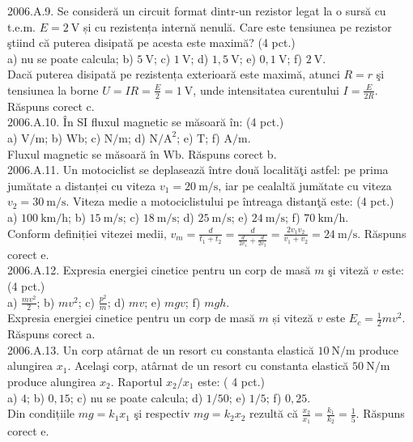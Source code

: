 2006.A.9. Se consideră un circuit format dintr-un rezistor legat la o sursă cu t.e.m. $E=2 \mathrm{~V}$ și cu rezistența internă nenulă. Care este tensiunea pe rezistor ştiind că puterea disipată pe acesta este maximă? (4 pct.)\\ a) nu se poate calcula; b) $5 \mathrm{~V}$; c) $1 \mathrm{~V}$; d) $1,5 \mathrm{~V}$; e) $0,1 \mathrm{~V}$; f) $2 \mathrm{~V}$.\\ Dacă puterea disipată pe rezistența exterioară este maximă, atunci $R=r$ şi tensiunea la borne $U=I R=\frac{E}{2}=1 \mathrm{~V}$, unde intensitatea curentului $I=\frac{E}{2 R}$. Răspuns corect c.\\

2006.A.10. În SI fluxul magnetic se măsoară în: (4 pct.)\\ a) $\mathrm{V} / \mathrm{m}$; b) $\mathrm{Wb}$; c) $\mathrm{N} / \mathrm{m}$; d) $\mathrm{N} / \mathrm{A}^{2}$; e) $\mathrm{T}$; f) $\mathrm{A} / \mathrm{m}$.\\ Fluxul magnetic se măsoară în $\mathrm{Wb}$. Răspuns corect b.\\

2006.A.11. Un motociclist se deplasează între două localităţi astfel: pe prima jumătate a distanței cu viteza $v_{1}=20 \mathrm{~m} / \mathrm{s}$, iar pe cealaltă jumătate cu viteza $v_{2}=30 \mathrm{~m} / \mathrm{s}$. Viteza medie a motociclistului pe întreaga distanţă este: (4 pct.)\\ a) $100 \mathrm{~km} / \mathrm{h}$; b) $15 \mathrm{~m} / \mathrm{s}$; c) $18 \mathrm{~m} / \mathrm{s}$; d) $25 \mathrm{~m} / \mathrm{s}$; e) $24 \mathrm{~m} / \mathrm{s}$; f) $70 \mathrm{~km} / \mathrm{h}$.\\ Conform definiției vitezei medii, $v_{m}=\frac{d}{t_{1}+t_{2}}=\frac{d}{\frac{d}{2 v_{1}}+\frac{d}{2 v_{2}}}=\frac{2 v_{1} v_{2}}{v_{1}+v_{2}}=24 \mathrm{~m} / \mathrm{s}$. Răspuns corect e.\\

2006.A.12. Expresia energiei cinetice pentru un corp de masă $m$ şi viteză $v$ este: (4 pct.)\\ a) $\frac{m v^{2}}{2}$; b) $m v^{2}$; c) $\frac{p^{2}}{m}$; d) $m v$; e) $m g v$; f) $m g h$.\\ Expresia energiei cinetice pentru un corp de masă $m$ și viteză $v$ este $E_{c}=\frac{1}{2} m v^{2}$. Răspuns corect a.\\

2006.A.13. Un corp atârnat de un resort cu constanta elastică $10 \mathrm{~N} / \mathrm{m}$ produce alungirea $x_{1}$. Acelaşi corp, atârnat de un resort cu constanta elastică $50 \mathrm{~N} / \mathrm{m}$ produce alungirea $x_{2}$. Raportul $x_{2} / x_{1}$ este: ( 4 pct.)\\ a) $4$; b) $0,15$; c) nu se poate calcula; d) $1 / 50$; e) $1 / 5$; f) $0,25$.\\ Din condițiile $m g=k_{1} x_{1}$ şi respectiv $m g=k_{2} x_{2}$ rezultă că $\frac{x_{2}}{x_{1}}=\frac{k_{1}}{k_{2}}=\frac{1}{5}$. Răspuns corect e.\\

